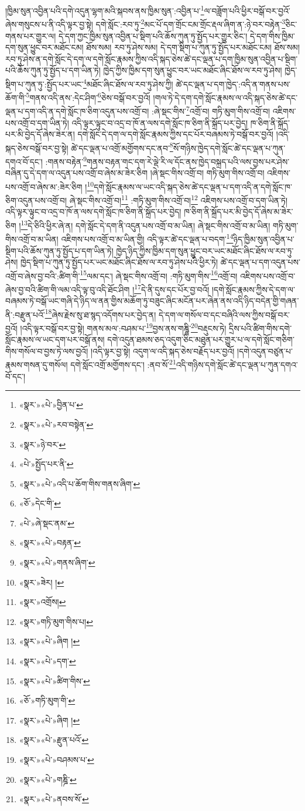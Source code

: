 །ཁྱིམ་སུན་འབྱིན་པའི་དགེ་འདུན་ལྷག་མའི་སྐབས་ནས་ཁྱིམ་སུན་:འབྱིན་པ་\footnote{«སྣར་»«པེ་»བྱིན་པ་}ལ་བཟློག་པའི་ཕྱིར་བསྒོ་བར་བྱའོ་ཞེས་གསུངས་པ་ནི་འདི་ལྟར་བྱ་སྟེ། དགེ་སློང་:རབ་ཏུ་\footnote{«སྣར་»«པེ་»རབ་བསྟེན་}མང་པོ་དག་གྲོང་ངམ་གྲོང་རྡལ་ཞིག་ན་:ཉེ་བར་བརྟེན་\footnote{«སྣར་»ཉེ་བར་}ཅིང་གནས་པར་གྱུར་ལ། དེ་དག་ཀྱང་ཁྱིམ་སུན་འབྱིན་པ་སྡིག་པའི་ཆོས་ཀུན་ཏུ་སྤྱོད་པར་གྱུར་ཅིང་། དེ་དག་གིས་ཁྱིམ་དག་སུན་ཕྱུང་བར་མཐོང་ངམ། ཐོས་སམ། རབ་ཏུ་ཤེས་སམ། དེ་དག་སྡིག་པ་ཀུན་ཏུ་སྤྱོད་པར་མཐོང་ངམ། ཐོས་སམ། རབ་ཏུ་ཤེས་ན་དགེ་སློང་དེ་དག་ལ་དགེ་སློང་རྣམས་ཀྱིས་འདི་སྐད་ཅེས་ཚེ་དང་ལྡན་པ་དག་ཁྱིམ་སུན་འབྱིན་པ་སྡིག་པའི་ཆོས་ཀུན་ཏུ་སྤྱོད་པ་དག་ཡིན་ཏེ། ཁྱེད་ཀྱིས་ཁྱིམ་དག་སུན་ཕྱུང་བར་ཡང་མཐོང་ཞིང་ཐོས་ལ་རབ་ཏུ་ཤེས། ཁྱེད་སྡིག་པ་ཀུན་ཏུ་:སྤྱོད་པར་ཡང་\footnote{«པེ་»སྤྱོད་པར་ནི་}མཐོང་ཞིང་ཐོས་ལ་རབ་ཏུ་ཤེས་ཀྱི། ཚེ་དང་ལྡན་པ་དག་ཁྱེད་:འདི་ན་གནས་པས་ཆོག་གི་\footnote{«སྣར་»«པེ་»འདི་པ་ཆོག་གིས་གནས་ཞིག་}གནས་འདི་ནས་:དེང་ཤིག་\footnote{«ཅོ་»དེང་གི་}ཅེས་བསྒོ་བར་བྱའོ། །གལ་ཏེ་དེ་དག་དགེ་སློང་རྣམས་ལ་འདི་སྐད་ཅེས་ཚེ་དང་ལྡན་པ་དག་འདི་ན་དགེ་སློང་ཁ་ཅིག་འདུན་པས་འགྲོ་བ། :ཞེ་སྡང་གིས་\footnote{«པེ་»ཞེ་སྡང་ནམ་}འགྲོ་བ། གཏི་མུག་གིས་འགྲོ་བ། འཇིགས་པས་འགྲོ་བ་དག་ཡིན་ཏེ། འདི་ལྟར་ལྟུང་བ་འདྲ་བ་ཁོ་ན་ལས་དགེ་སློང་ཁ་ཅིག་ནི་སྐྲོད་པར་བྱེད། ཁ་ཅིག་ནི་སྐྲོད་པར་མི་བྱེད་དོ་ཞེས་ཟེར་ན། དགེ་སློང་དེ་དག་ལ་དགེ་སློང་རྣམས་ཀྱིས་དང་པོར་བཞམས་ཏེ་བསྒོ་བར་བྱའོ། །འདི་སྐད་ཅེས་བསྒོ་བར་བྱ་སྟེ། ཚེ་དང་ལྡན་པ་འགྲོ་མགྱོགས་དང་ནབ་\footnote{«སྣར་»«པེ་»བརྟན་}སོ་གཉིས་ཁྱེད་དགེ་སློང་ཚེ་དང་ལྡན་པ་ཀུན་དགའ་བོ་དང་། :གནས་བརྟེན་\footnote{«སྣར་»«པེ་»གནས་ཞིག་}གནས་བརྟན་གང་དག་རེ་ལྡེ་རི་ལ་དོང་ནས་ཁྱེད་བསྐྲད་པའི་ལས་བྱས་པར་ཤེས་བཞིན་དུ་དེ་དག་ལ་འདུན་པས་འགྲོ་བ་ཞེས་མ་ཟེར་ཅིག །ཞེ་སྡང་གིས་འགྲོ་བ། གཏི་མུག་གིས་འགྲོ་བ། འཇིགས་པས་འགྲོ་བ་ཞེས་མ་:ཟེར་ཅིག །\footnote{«སྣར་»ཟེར། །}དགེ་སློང་རྣམས་ལ་ཡང་འདི་སྐད་ཅེས་ཚེ་དང་ལྡན་པ་དག་འདི་ན་དགེ་སློང་ཁ་ཅིག་འདུན་པས་འགྲོ་བ། ཞེ་སྡང་གིས་འགྲོ་བ།\footnote{«སྣར་»འགྲོས།} :གཏི་མུག་གིས་འགྲོ་བ།\footnote{«སྣར་»གཏི་མུག་གིས་པ།} འཇིགས་པས་འགྲོ་བ་དག་ཡིན་ཏེ། འདི་ལྟར་ལྟུང་བ་འདྲ་བ་ཁོ་ན་ལས་དགེ་སློང་ཁ་ཅིག་ནི་སྐྲོད་པར་བྱེད། ཁ་ཅིག་ནི་སྐྲོད་པར་མི་བྱེད་དོ་ཞེས་མ་ཟེར་ཅིག །\footnote{«སྣར་»«པེ་»ཞིག །}དེ་ཅིའི་ཕྱིར་ཞེ་ན། དགེ་སློང་དེ་དག་ནི་འདུན་པས་འགྲོ་བ་མ་ཡིན། ཞེ་སྡང་གིས་འགྲོ་བ་མ་ཡིན། གཏི་མུག་གིས་འགྲོ་བ་མ་ཡིན། འཇིགས་པས་འགྲོ་བ་མ་ཡིན་གྱི། འདི་ལྟར་ཚེ་དང་ལྡན་པ་བདག་\footnote{«སྣར་»«པེ་»དག་}ཉིད་ཁྱིམ་སུན་འབྱིན་པ་སྡིག་པའི་ཆོས་ཀུན་ཏུ་སྤྱོད་པ་དག་ཡིན་ཏེ། ཁྱེད་ཉིད་ཀྱིས་ཁྱིམ་དག་སུན་ཕྱུང་བར་ཡང་མཐོང་ཞིང་ཐོས་ལ་རབ་ཏུ་ཤེས། ཁྱེད་སྡིག་པ་ཀུན་ཏུ་སྤྱོད་པར་ཡང་མཐོང་ཞིང་ཐོས་ལ་རབ་ཏུ་ཤེས་པའི་ཕྱིར་ཏེ། ཚེ་དང་ལྡན་པ་དག་འདུན་པས་འགྲོ་བ་ཞེས་བྱ་བའི་:ཚིག་གི་\footnote{«སྣར་»«པེ་»ཚིག་གིས་}ལམ་དང་། ཞེ་སྡང་གིས་འགྲོ་བ། :གཏི་མུག་གིས་\footnote{«ཅོ་»གཏི་མུག་གི་}འགྲོ་བ། འཇིགས་པས་འགྲོ་བ་ཞེས་བྱ་བའི་ཚིག་གི་ལམ་འདི་ལྟ་བུ་འདི་ཐོང་ཤིག །\footnote{«སྣར་»«པེ་»ཞིག །}དེ་ནི་དུས་དང་པོར་བྱ་བའོ། །དགེ་སློང་རྣམས་ཀྱིས་དེ་དག་ལ་བཞམས་ཏེ་བསྒོ་ཡང་གཞི་དེ་ཉིད་ལ་ནན་གྱིས་མཆོག་ཏུ་བཟུང་ཞིང་མངོན་པར་ཞེན་ནས་འདི་ཉིད་བདེན་གྱི་གཞན་ནི་:བརྫུན་པའོ་\footnote{«སྣར་»«པེ་»རྫུན་པའོ་}ཞེས་རྗེས་སུ་ཐ་སྙད་འདོགས་པར་བྱེད་ན། དེ་དག་ལ་གསོལ་བ་དང་བཞིའི་ལས་ཀྱིས་བསྒོ་བར་བྱའོ། །འདི་ལྟར་བསྒོ་བར་བྱ་སྟེ། གནས་མལ་:བཤམ་པ་\footnote{«སྣར་»«པེ་»བཤམས་པ་}བྱས་ནས་གཎྜཱི་\footnote{«སྣར་»«པེ་»གཎྜི་}བརྡུངས་ཏེ། དྲིས་པའི་ཚིག་གིས་དགེ་སློང་རྣམས་ལ་ཡང་དག་པར་བསྒོ་ནས། དགེ་འདུན་ཐམས་ཅད་འདུག་ཅིང་མཐུན་པར་གྱུར་པ་ལ་དགེ་སློང་གཅིག་གིས་གསོལ་བ་བྱས་ཏེ་ལས་བྱའོ། །འདི་ལྟར་བྱ་སྟེ། འདུག་ལ་འདི་སྐད་ཅེས་བརྗོད་པར་བྱའོ། །དགེ་འདུན་བཙུན་པ་རྣམས་གསན་དུ་གསོལ། དགེ་སློང་འགྲོ་མགྱོགས་དང་། :ནབ་སོ་\footnote{«སྣར་»«པེ་»ནབས་སོ་}འདི་གཉིས་དགེ་སློང་ཚེ་དང་ལྡན་པ་ཀུན་དགའ་བོ་དང་། 